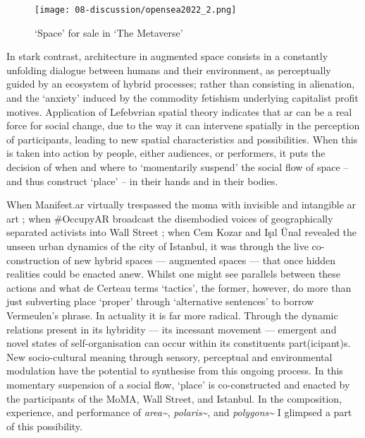 \begin{figure}[ht]
    \centering
    \texttt{[image: 08-discussion/opensea2022\_2.png]}
    \captionsetup{justification=centering,margin=1.5cm}
    \caption{`Space' for sale in `The Metaverse' \citep[from][]{opensea2022}}\label{fig: opensea2022_2}
\end{figure}

In stark contrast, architecture in augmented space consists in a constantly unfolding dialogue between humans and their environment, as perceptually guided by an ecosystem of hybrid processes; rather than consisting in alienation, and the `anxiety' induced by the commodity fetishism underlying capitalist profit motives. Application of Lefebvrian spatial theory indicates that \gls{ar} can be a real force for social change, due to the way it can intervene spatially in the perception of participants, leading to new spatial characteristics and possibilities. When this is taken into action by people, either audiences, or performers, it puts the decision of when and where to `momentarily suspend' the social flow of space -- and thus construct `place' -- in their hands and in their bodies.

When Manifest.\gls{ar} virtually trespassed the \gls{moma} with invisible and intangible \gls{ar} art \citep{veenhof2010}; when \#OccupyAR broadcast the disembodied voices of geographically separated activists into Wall Street \citep{skwarek2018}; when Cem Kozar and Işıl Ünal \citeyearpar{thiel2011,thiel2018} revealed the unseen urban dynamics of the city of Istanbul, it was through the live co-construction of new hybrid spaces — augmented spaces — that once hidden realities could be enacted anew. Whilst one might see parallels between these actions and what de Certeau terms `tactics', the former, however, do more than just subverting place `proper' through `alternative sentences' to borrow Vermeulen's phrase. In actuality it is far more radical. Through the dynamic relations present in its hybridity — its incessant movement — emergent and novel states of self-organisation can occur within its constituents part(icipant)s. New socio-cultural meaning through sensory, perceptual and environmental modulation have the potential to synthesise from this ongoing process. In this momentary suspension of a social flow, `place' is co-constructed and enacted by the participants of the MoMA, Wall Street, and Istanbul. In the composition, experience, and performance of \textit{area\textasciitilde{}}, \textit{polaris\textasciitilde{}}, and \textit{polygons\textasciitilde{}} I glimpsed a part of this possibility.



